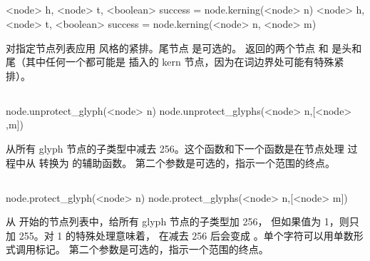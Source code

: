 \subsection{}


\begin{typing}
<node> h, <node> t, <boolean> success =
    node.kerning(<node> n)
<node> h, <node> t, <boolean> success =
    node.kerning(<node> n, <node> m)
\end{typing}

对指定节点列表应用 \TEX 风格的紧排。尾节点  是可选的。
返回的两个节点  和  是头和尾（其中任何一个都可能是
插入的 kern 节点，因为在词边界处可能有特殊紧排）。

\subsection{}


\begin{typing}
node.unprotect_glyph(<node> n)
node.unprotect_glyphs(<node> n,[<node> ,m])
\end{typing}

从所有 glyph 节点的子类型中减去 256。这个函数和下一个函数是在节点处理
过程中从  转换为  的辅助函数。
第二个参数是可选的，指示一个范围的终点。

\subsection{}


\begin{typing}
node.protect_glyph(<node> n)
node.protect_glyphs(<node> n,[<node> m])
\end{typing}

从  开始的节点列表中，给所有 glyph 节点的子类型加 256，
但如果值为 1，则只加 255。对 1 的特殊处理意味着，
在减去 256 后会变成 。单个字符可以用单数形式调用标记。
第二个参数是可选的，指示一个范围的终点。

\subsection{}

